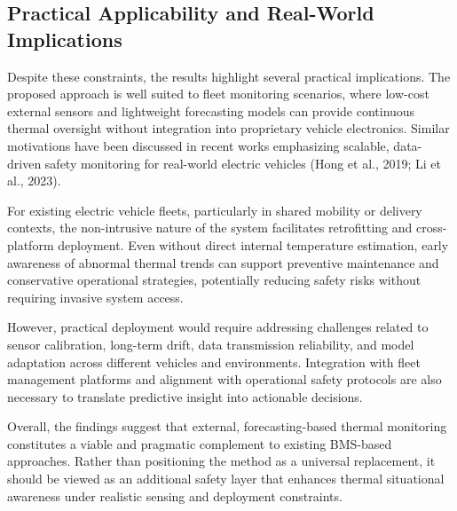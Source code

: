 \documentclass[conference]{IEEEtran}
\begin{document}
\subsection{Practical Applicability and Real-World Implications}

Despite these constraints, the results highlight several practical implications. The proposed approach is well suited to fleet monitoring scenarios, where low-cost external sensors and lightweight forecasting models can provide continuous thermal oversight without integration into proprietary vehicle electronics. Similar motivations have been discussed in recent works emphasizing scalable, data-driven safety monitoring for real-world electric vehicles (Hong et al., 2019; Li et al., 2023).

For existing electric vehicle fleets, particularly in shared mobility or delivery contexts, the non-intrusive nature of the system facilitates retrofitting and cross-platform deployment. Even without direct internal temperature estimation, early awareness of abnormal thermal trends can support preventive maintenance and conservative operational strategies, potentially reducing safety risks without requiring invasive system access.

However, practical deployment would require addressing challenges related to sensor calibration, long-term drift, data transmission reliability, and model adaptation across different vehicles and environments. Integration with fleet management platforms and alignment with operational safety protocols are also necessary to translate predictive insight into actionable decisions.

Overall, the findings suggest that external, forecasting-based thermal monitoring constitutes a viable and pragmatic complement to existing BMS-based approaches. Rather than positioning the method as a universal replacement, it should be viewed as an additional safety layer that enhances thermal situational awareness under realistic sensing and deployment constraints.
\end{document}
